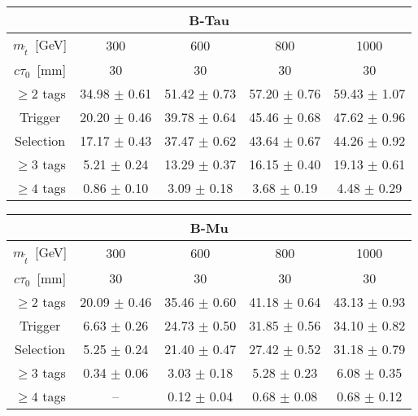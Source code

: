 \begin{table}[tb]
\begin{center}
\begin{tabular}{ccccc} 
\multicolumn{5}{c}{\textbf{B-Tau}} \\
 \hline 
 $m_{\tilde{t}}$~[GeV] & 300 & 600 & 800 & 1000 \\ 
$c\tau_0$~[mm] & 30 & 30 & 30 & 30 \\ 
 \hline 
$\geq 2$ tags  & 34.98 $\pm$ 0.61 & 51.42 $\pm$ 0.73 & 57.20 $\pm$ 0.76 & 59.43 $\pm$ 1.07 \\ 
 Trigger       & 20.20 $\pm$ 0.46 & 39.78 $\pm$ 0.64 & 45.46 $\pm$ 0.68 & 47.62 $\pm$ 0.96 \\ 
 Selection     & 17.17 $\pm$ 0.43 & 37.47 $\pm$ 0.62 & 43.64 $\pm$ 0.67 & 44.26 $\pm$ 0.92 \\ 
 $\geq 3$ tags & 5.21 $\pm$ 0.24  & 13.29 $\pm$ 0.37 & 16.15 $\pm$ 0.40 & 19.13 $\pm$ 0.61 \\ 
 $\geq 4$ tags & 0.86 $\pm$ 0.10  & 3.09 $\pm$ 0.18  & 3.68 $\pm$ 0.19  & 4.48 $\pm$ 0.29  \\ 
\end{tabular}

\begin{tabular}{ccccc} 
\multicolumn{5}{c}{\textbf{B-Mu}} \\
 \hline 
 $m_{\tilde{t}}$~[GeV] & 300 & 600 & 800 & 1000 \\ 
 $c\tau_0$~[mm] & 30 & 30 & 30 & 30 \\ 
\hline 
$\geq 2$ tags & 20.09 $\pm$ 0.46  & 35.46 $\pm$ 0.60  & 41.18 $\pm$ 0.64  & 43.13 $\pm$ 0.93 \\ 
Trigger       & 6.63 $\pm$ 0.26   & 24.73 $\pm$ 0.50  & 31.85 $\pm$ 0.56  & 34.10 $\pm$ 0.82 \\ 
Selection     & 5.25 $\pm$ 0.24   & 21.40 $\pm$ 0.47  & 27.42 $\pm$ 0.52  & 31.18 $\pm$ 0.79 \\ 
$\geq 3$ tags & 0.34 $\pm$ 0.06 & 3.03 $\pm$ 0.18   & 5.28 $\pm$ 0.23   & 6.08 $\pm$ 0.35  \\ 
$\geq 4$ tags & --                & 0.12 $\pm$ 0.04 & 0.68 $\pm$ 0.08 & 0.68 $\pm$ 0.12  \\ 
\end{tabular}
\end{center}
\end{table}
